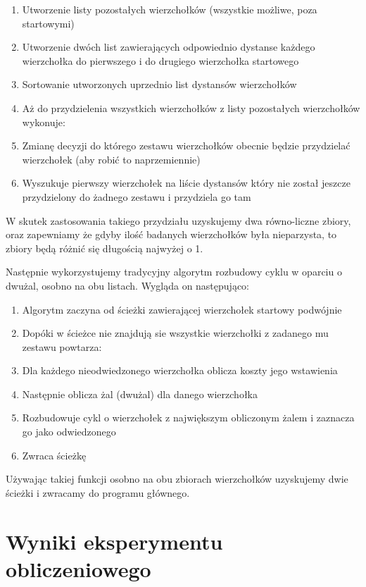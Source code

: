 \documentclass[11pt]{article}
\begin{document}
\begin{enumerate}
    \item Utworzenie listy pozostałych wierzchołków (wszystkie możliwe, poza startowymi)
    \item Utworzenie dwóch list zawierających odpowiednio dystanse każdego wierzchołka do pierwszego i do drugiego wierzchołka startowego
    \item Sortowanie utworzonych uprzednio list dystansów wierzchołków
    \item Aż do przydzielenia wszystkich wierzchołków z listy pozostałych wierzchołków wykonuje:
    \item Zmianę decyzji do którego zestawu wierzchołków obecnie będzie przydzielać wierzchołek (aby robić to naprzemiennie)
    \item Wyszukuje pierwszy wierzchołek na liście dystansów który nie został jeszcze przydzielony do żadnego zestawu i przydziela go tam
\end{enumerate}

W skutek zastosowania takiego przydziału uzyskujemy dwa równo-liczne zbiory, oraz zapewniamy że gdyby ilość badanych wierzchołków była nieparzysta, to zbiory będą różnić się długością najwyżej o 1.

Następnie wykorzystujemy tradycyjny algorytm rozbudowy cyklu w oparciu o dwużal, osobno na obu listach. Wygląda on następująco:

\begin{enumerate}
    \item Algorytm zaczyna od ścieżki zawierającej wierzchołek startowy podwójnie
    \item Dopóki w ścieżce nie znajdują sie wszystkie wierzchołki z zadanego mu zestawu powtarza:
    \item Dla każdego nieodwiedzonego wierzchołka oblicza koszty jego wstawienia
    \item Następnie oblicza żal (dwużal) dla danego wierzchołka
    \item Rozbudowuje cykl o wierzchołek z największym obliczonym żalem i zaznacza go jako odwiedzonego
    \item Zwraca ścieżkę
\end{enumerate}

Używając takiej funkcji osobno na obu zbiorach wierzchołków uzyskujemy dwie ścieżki i zwracamy do programu głównego.


\section{Wyniki eksperymentu obliczeniowego}\label{sec:wyniki-eksperymenty-obliczeniowego}
\end{document}
